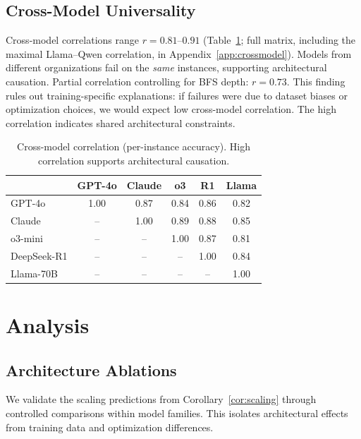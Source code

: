 \documentclass{article}
\theoremstyle{plain}
\theoremstyle{definition}
\theoremstyle{remark}
\begin{document}
\subsection{Cross-Model Universality}

Cross-model correlations range $r = 0.81$--$0.91$ (Table~\ref{tab:crossmodel}; full matrix, including the maximal Llama--Qwen correlation, in Appendix~\ref{app:crossmodel}). Models from different organizations fail on the \emph{same} instances, supporting architectural causation. Partial correlation controlling for BFS depth: $r = 0.73$. This finding rules out training-specific explanations: if failures were due to dataset biases or optimization choices, we would expect low cross-model correlation. The high correlation indicates shared architectural constraints.

\begin{table}[t]
\caption{Cross-model correlation (per-instance accuracy). High correlation supports architectural causation.}
\label{tab:crossmodel}
\vskip 0.1in
\centering
\footnotesize
\begin{tabular}{@{}lccccc@{}}
\toprule
& \textbf{GPT-4o} & \textbf{Claude} & \textbf{o3} & \textbf{R1} & \textbf{Llama} \\
\midrule
GPT-4o & 1.00 & 0.87 & 0.84 & 0.86 & 0.82 \\
Claude & -- & 1.00 & 0.89 & 0.88 & 0.85 \\
o3-mini & -- & -- & 1.00 & 0.87 & 0.81 \\
DeepSeek-R1 & -- & -- & -- & 1.00 & 0.84 \\
Llama-70B & -- & -- & -- & -- & 1.00 \\
\bottomrule
\end{tabular}
\vskip -0.1in
\end{table}


\section{Analysis}
\label{sec:analysis}

\subsection{Architecture Ablations}
\label{sec:ablations}

We validate the scaling predictions from Corollary~\ref{cor:scaling} through controlled comparisons within model families. This isolates architectural effects from training data and optimization differences.
\end{document}
